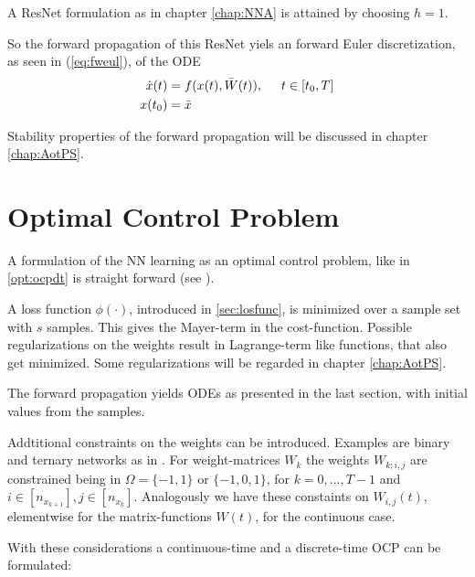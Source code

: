 \documentclass[a4paper, 12pt]{scrreprt} %
\begin{document}
A ResNet formulation as in chapter \ref{chap:NNA} is attained by choosing $h=1$.

So the forward propagation of this ResNet yiels an forward Euler discretization, as seen in (\ref{eq:fweul}), of the \ac{ODE}
\begin{align*}
\dot x(t) &= f(x(t),\bar{W}(t)) , \hspace{0.5cm}t\in [t_0,T] \\
x(t_0) &= \bar{x} 
\end{align*}

Stability properties of the forward propagation will be discussed in chapter \ref{chap:AotPS}.

\section{Optimal Control Problem}

A formulation of the \ac{NN} learning as an optimal control problem, like in \ref{opt:ocpdt} is straight forward (see \cite{aocatdl}). \newline

A loss function $\phi(\cdot)$, introduced in \ref{sec:losfunc}, is minimized over a sample set with $s$ samples. This gives the Mayer-term in the cost-function. Possible regularizations on the weights result in Lagrange-term like functions, that also get minimized. Some regularizations will be regarded in chapter \ref{chap:AotPS}. 

The forward propagation yields \acp{ODE} as presented in the last section, with initial values from the samples.

Addtitional constraints on the weights can be introduced. Examples are binary and ternary networks as in \cite{aocatdl}. For weight-matrices $W_k$ the  weights $W_{k;i,j}$ are constrained being in $\Omega = \{-1,1\}$ or $\{-1,0,1\}$, for $k=0,\dots,T-1$ and $i\in [n_{x_{k+1}}], j\in [n_{x_k}]$. Analogously we have these constaints on $W_{i,j}(t)$, elementwise for the matrix-functions $W(t)$, for the continuous case. \newline

With these considerations a continuous-time and a discrete-time \ac{OCP} can be formulated:
\end{document}
